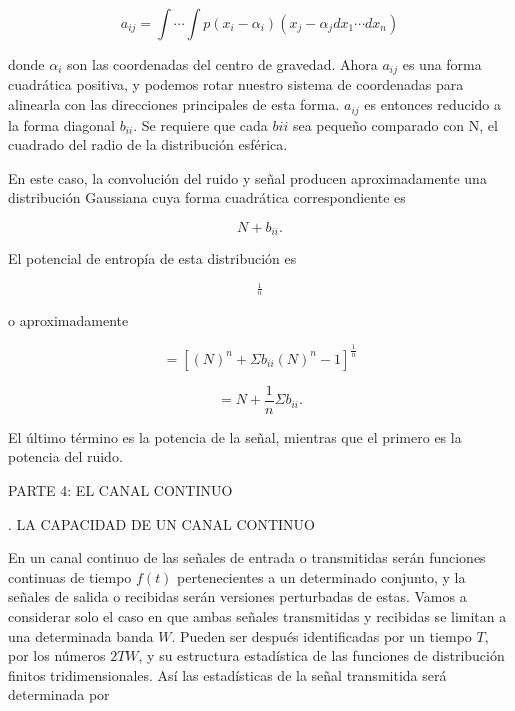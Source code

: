	\begin{equation}
		a_{ij}=\int \cdots \int p(x_{i}-\alpha_{i})(x_{j}-\alpha_{j}dx_{1} \cdots dx_{n})
	\end{equation}

	donde $\alpha_{i}$ son las coordenadas del centro de gravedad. Ahora $a_{ij}$ es una 
	forma cuadr\'atica positiva, y podemos rotar nuestro sistema de coordenadas para
	alinearla con las direcciones principales de esta forma. $a_{ij}$ es entonces
	reducido a la forma diagonal $b_{ii}$. Se requiere que cada $b{ii}$ sea peque\~no
	comparado con N, el cuadrado del radio de la distribuci\'on esf\'erica.
	
	En este caso, la convoluci\'on del ruido y se\~nal producen aproximadamente una 
	distribuci\'on Gaussiana cuya forma cuadr\'atica correspondiente es
	
	\begin{equation}
		N + b_{ii}.
	\end{equation}
	
	El potencial de entrop\'ia de esta distribuci\'on es
	
	\begin{equation}
		[\Pi(N + b_{ii})]^\frac{1}{n}
	\end{equation}
	
	o aproximadamente
	
	\begin{equation}
		= [(N)^n + \Sigma b_{ii}(N)^n-1]^\frac{1}{n}
	\end{equation}
	
	\begin{equation}
		= N + \frac{1}{n}\Sigma b_{ii}.
	\end{equation}
	
	El \'ultimo t\'ermino es la potencia de la se\~nal, mientras que el primero es la
	potencia del ruido.
	
	
	\begin{center}
	PARTE 4: EL CANAL CONTINUO
	
	. LA CAPACIDAD DE UN CANAL CONTINUO	
	\end{center}
	
	En un canal continuo de las se\~nales de entrada o transmitidas ser\'an funciones
	continuas de tiempo $f(t)$ pertenecientes a un determinado conjunto, y la señales de
	salida o recibidas ser\'an versiones perturbadas de estas. Vamos a considerar solo
	el caso en que ambas se\~nales transmitidas y recibidas se limitan a una determinada 
	banda $W$. Pueden ser despu\'es identificadas por un tiempo $T$, por los n\'umeros
	$2TW$, y su estructura estad\'istica de las funciones de distribuci\'on finitos
	tridimensionales. As\'i las estad\'isticas de la se\~nal transmitida ser\'a
	determinada por
	
